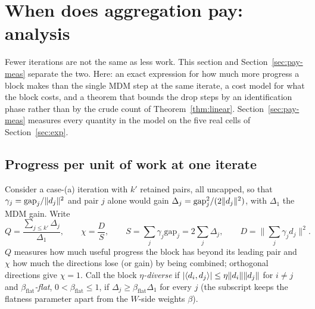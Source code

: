 \section{When does aggregation pay: analysis}\label{sec:pay}

Fewer iterations are not the same as less work. This section and
Section~\ref{sec:pay-meas} separate the two. Here: an exact expression
for how much more progress a block makes than the single MDM step at
the same iterate, a cost model for what the block costs, and a theorem
that bounds the drop steps by an identification phase rather than by
the crude count of Theorem~\ref{thm:linear}. Section~\ref{sec:pay-meas}
measures every quantity in the model on the five real cells of
Section~\ref{sec:exp}.

\subsection{Progress per unit of work at one iterate}

Consider a case-(a) iteration with $k'$ retained pairs, all uncapped,
so that $\gamma_j=\mathrm{gap}_j/\lVert d_j \rVert^2$ and pair $j$ alone would
gain $\Delta_j=\mathrm{gap}_j^2/(2\lVert d_j \rVert^2)$, with $\Delta_1$ the MDM
gain. Write
\[
Q=\frac{\sum_{j\le k'}\Delta_j}{\Delta_1},\qquad
\chi=\frac{D}{S},\qquad
S=\sum_j\gamma_j\mathrm{gap}_j=2\sum_j\Delta_j,\qquad
D=\Big\lVert\sum_j\gamma_jd_j\Big\rVert^2 .
\]
$Q$ measures how much useful progress the block has beyond its leading
pair and $\chi$ how much the directions lose (or gain) by being
combined; orthogonal directions give $\chi=1$. Call the block
\emph{$\eta$-diverse} if $|\langle d_i, d_j \rangle|\le\eta\lVert d_i \rVert\lVert d_j \rVert$ for
$i\ne j$ and \emph{$\beta_{\mathrm{flat}}$-flat}, $0<\beta_{\mathrm{flat}}\le1$, if
$\Delta_j\ge\beta_{\mathrm{flat}}\Delta_1$ for every $j$ (the subscript keeps
the flatness parameter apart from the $W$-side weights $\beta$).

